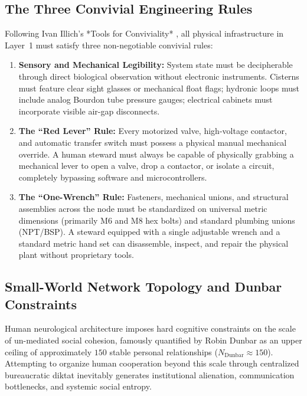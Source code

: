 \subsection{The Three Convivial Engineering Rules}
Following Ivan Illich's *Tools for Conviviality* \cite{illich1973}, all physical infrastructure in Layer~1 must satisfy three non-negotiable convivial rules:
\begin{enumerate}
    \item \textbf{Sensory and Mechanical Legibility:} System state must be decipherable through direct biological observation without electronic instruments. Cisterns must feature clear sight glasses or mechanical float flags; hydronic loops must include analog Bourdon tube pressure gauges; electrical cabinets must incorporate visible air-gap disconnects.
    \item \textbf{The ``Red Lever'' Rule:} Every motorized valve, high-voltage contactor, and automatic transfer switch must possess a physical manual mechanical override. A human steward must always be capable of physically grabbing a mechanical lever to open a valve, drop a contactor, or isolate a circuit, completely bypassing software and microcontrollers.
    \item \textbf{The ``One-Wrench'' Rule:} Fasteners, mechanical unions, and structural assemblies across the node must be standardized on universal metric dimensions (primarily M6 and M8 hex bolts) and standard plumbing unions (NPT/BSP). A steward equipped with a single adjustable wrench and a standard metric hand set can disassemble, inspect, and repair the physical plant without proprietary tools.
\end{enumerate}

\subsection{Small-World Network Topology and Dunbar Constraints}
Human neurological architecture imposes hard cognitive constraints on the scale of un-mediated social cohesion, famously quantified by Robin Dunbar as an upper ceiling of approximately $150$ stable personal relationships ($N_{\mathrm{Dunbar}} \approx 150$). Attempting to organize human cooperation beyond this scale through centralized bureaucratic diktat inevitably generates institutional alienation, communication bottlenecks, and systemic social entropy.

